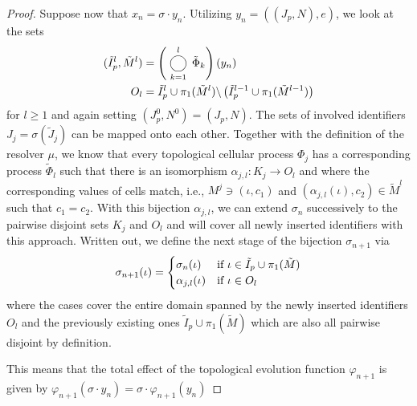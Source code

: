 \begin{proof}
    Suppose now that $x_n=\sigma\cdot y_n$.
    Utilizing $y_n=((J_p,N),e)$, we look at the sets
    \begin{align}
        (\tilde{I}_p^l,\tilde{M}^l) &= \left(\bigcomp_{k=1}^l\tilde{\Phi}_k\right)(y_n)\\
        O_l &= \tilde{I}_p^l\cup\pi_1(\tilde{M}^l)\backslash
            \left(\tilde{I}_p^{l-1}\cup\pi_1(\tilde{M}^{l-1})\right)
    \end{align}
    for $l\geq1$ and again setting $(J_p^0,N^0)=(J_p,N)$.
    The sets of involved identifiers $J_j=\sigma(\tilde{J}_j)$ can be mapped onto each other.
    Together with the definition of the resolver $\mu$, we know that every topological cellular
    process $\Phi_j$ has a corresponding process $\tilde{\Phi}_l$ such that there is an isomorphism
    $\alpha_{j,l}:K_j\rightarrow O_l$ and where the corresponding values of cells match, i.e.,
    $M^j\ni(\iota,c_1)$ and $(\alpha_{j,l}(\iota),c_2)\in\tilde{M}^l$ such that $c_1=c_2$.
    With this bijection $\alpha_{j,l}$, we can extend $\sigma_n$ successively to the pairwise
    disjoint sets $K_j$ and $O_l$ and will cover all newly inserted identifiers with this approach.
    Written out, we define the next stage of the bijection $\sigma_{n+1}$ via
    \begin{equation}
        \sigma_{n+1}(\iota) =
        \begin{cases}
            \sigma_n(\iota) &\text{\normalfont if } \iota\in\tilde{I}_p\cup\pi_1(\tilde{M})\\
            \alpha_{j,l}(\iota) &\text{\normalfont if } \iota\in O_l
        \end{cases}
    \end{equation}
    where the cases cover the entire domain spanned by the newly inserted identifiers $O_l$ and the
    previously existing ones $\tilde{I}_p\cup\pi_1(\tilde{M})$ which are also all pairwise disjoint
    by definition.

    This means that the total effect of the topological evolution function $\varphi_{n+1}$ is given
    by $\varphi_{n+1}(\sigma\cdot y_n)=\sigma\cdot\varphi_{n+1}(y_n)$
\end{proof}

